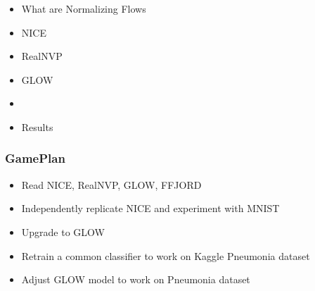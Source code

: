 \begin{frame}
\begin{itemize}
    \item What are Normalizing Flows
    \item NICE
    \item RealNVP
    \item GLOW
    \item \textbf{\color{red}{GamePlan}}
    \item Results
\end{itemize}
\end{frame}

\begin{frame}
    \frametitle{GamePlan}
    \begin{itemize}
        \item Read NICE, RealNVP, GLOW, FFJORD
        \item Independently replicate NICE and experiment with MNIST
        \item Upgrade to GLOW
        \item Retrain a common classifier to work on Kaggle Pneumonia dataset
        \item Adjust GLOW model to work on Pneumonia dataset
    \end{itemize}
\end{frame}
